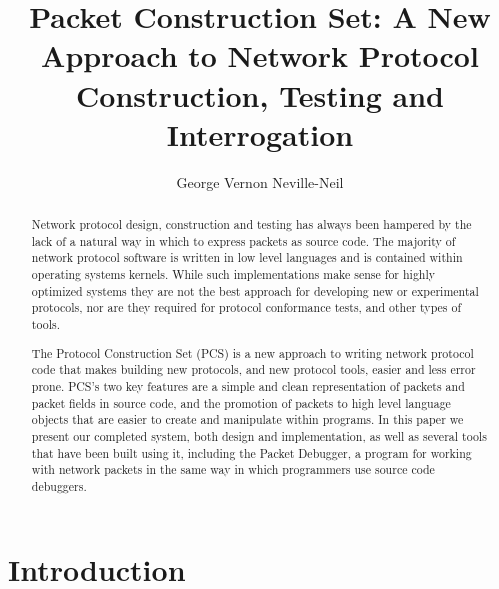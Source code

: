 \documentclass[pdftex]{article}
\title{Packet Construction Set: A New Approach to Network Protocol
  Construction, Testing and Interrogation}
\author{George Vernon Neville-Neil}
\begin{document}

\maketitle
\begin{abstract}
Network protocol design, construction and testing has always been
hampered by the lack of a natural way in which to express packets as
source code.  The majority of network protocol software is written in
low level languages and is contained within operating systems
kernels.  While such implementations make sense for highly optimized
systems they are not the best approach for developing new or
experimental protocols, nor are they required for protocol conformance
tests, and other types of tools.

The Protocol Construction Set (PCS) is a new approach to writing
network protocol code that makes building new protocols, and new
protocol tools, easier and less error prone.  PCS's two key features
are a simple and clean representation of packets and packet fields in
source code, and the promotion of packets to high level language
objects that are easier to create and manipulate within programs.  In
this paper we present our completed system, both design and
implementation, as well as several tools that have been built using
it, including the Packet Debugger, a program for working with network
packets in the same way in which programmers use source code
debuggers.

\end{abstract}

\section{Introduction}
\end{document}
